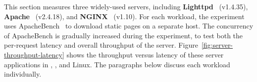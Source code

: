 This section measures three widely-used servers, including {\bf Lighttpd}~\cite{lighttpd} (v1.4.35), {\bf Apache}~\cite{apache} (v2.4.18), and {\bf NGINX}~\cite{nginx} (v1.10).
For each workload, the experiment uses ApacheBench~\cite{apachebench} to download static pages on a separate host.
The concurrency of ApacheBench is gradually increased during the experiment, to test both the per-request latency and overall throughput of the server.
Figure~\ref{fig:server-throughput-latency} shows the throughput versus latency of these server applications
in \graphenesgx{}, \graphene{}, and Linux. 
The paragraphs below discuss each workload individually.



